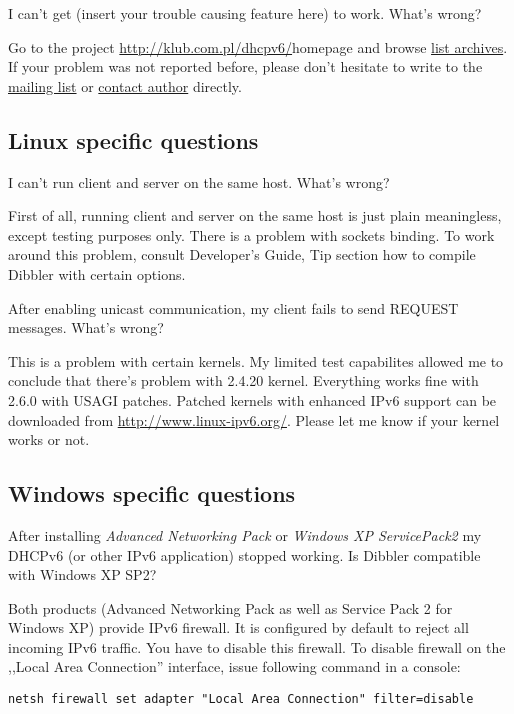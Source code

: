 \Q I can't get (insert your trouble causing feature here) to
work. What's wrong? 

\A Go to the project \url{http://klub.com.pl/dhcpv6/}{homepage} and
browse \href{http://klub.com.pl/lists/dibbler/}{list archives}. If
your problem was not reported before, please don't hesitate to write
to the
\href{http://klub.com.pl/cgi-bin/mailman/listinfo/dibbler}{mailing
  list} or \href{mailto:thomson(at)klub.com.pl}{contact author}
directly. 

\subsection{Linux specific questions}

\Q I can't run client and server on the same host. What's wrong?

\A First of all, running client and server on the same host is just
plain meaningless, except testing purposes only. There is a problem
with sockets binding. To work around this problem, consult Developer's
Guide, Tip section how to compile Dibbler with certain options.

\Q After enabling unicast communication, my client fails to send
REQUEST messages. What's wrong?

\A This is a problem with certain kernels. My limited test capabilites
allowed me to conclude that there's problem with 2.4.20
kernel. Everything works fine with 2.6.0 with USAGI patches. Patched 
kernels with enhanced IPv6 support can be downloaded from
\url{http://www.linux-ipv6.org/}. Please let me know if your kernel
works or not.

\subsection{Windows specific questions}

\Q After installing \emph{Advanced Networking Pack} or \emph{Windows XP
  ServicePack2} my DHCPv6 (or other IPv6 application) stopped
   working. Is Dibbler compatible with Windows XP SP2?

\A Both products (Advanced Networking Pack as well as Service Pack 2
for Windows XP) provide IPv6 firewall. It is configured by default to
reject all incoming IPv6 traffic. You have to disable this
firewall. To disable firewall on the ,,Local Area Connection''
interface, issue following command in a console:

\begin{verbatim}
netsh firewall set adapter "Local Area Connection" filter=disable
\end{verbatim}

